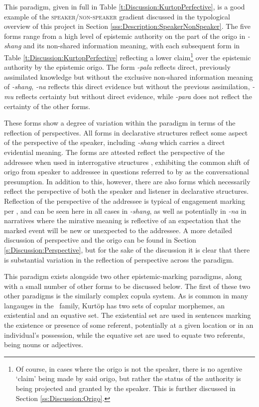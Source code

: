 This paradigm, given in full in Table \ref{t:Discussion:KurtopPerfective}, is a good example of the \textsc{speaker/non-speaker} gradient discussed in the typological overview of this project in Section \ref{sss:Description:SpeakerNonSpeaker}. The five forms range from a high level of epistemic authority on the part of the origo in \textit{-shang} and its non-shared information meaning, with each subsequent form in Table \ref{t:Discussion:KurtopPerfective} reflecting a lower claim\footnote{Of course, in cases where the origo is not the speaker, there is no agentive `claim' being made by said origo, but rather the status of the authority is being projected and granted by the speaker. This is further discussed in Section \ref{ss:Discussion:Origo}.} over the epistemic authority by the epistemic origo. The form \textit{-pala} reflects direct, previously assimilated knowledge but without the exclusive non-shared information meaning of \textit{-shang}, \textit{-na} reflects this direct evidence but without the previous assimilation, \textit{-mu} reflects certainty but without direct evidence, while \textit{-para} does not reflect the certainty of the other forms.

These forms show a degree of variation within the paradigm in terms of the reflection of perspectives. All forms in declarative structures reflect some aspect of the perspective of the speaker, including \textit{-shang} which carries a direct evidential meaning. The forms are attested reflect the perspective of the addressee when used in interrogative structures \cite{Hyslop2018}, exhibiting the common shift of origo from speaker to addressee in questions referred to by  as the conversational presumption. In addition to this, however, there are also forms which necessarily reflect the perspective of both the speaker and listener in declarative structures. Reflection of the perspective of the addressee is typical of engagement marking per , and can be seen here in all cases in \textit{-shang}, as well as potentially in \textit{-na} in narratives where the mirative meaning is reflective of an expectation that the marked event will be new or unexpected to the addressee. A more detailed discussion of perspective and the origo can be found in Section \ref{s:Discussion:Perspective}, but for the sake of the discussion it is clear that there is substantial variation in the reflection of perspective across the paradigm.

This paradigm exists alongside two other epistemic-marking paradigms, along with a small number of other forms to be discussed below. The first of these two other paradigms is the similarly complex copula system. As is common in many langauges in the \lfam\ family, Kurtöp has two sets of copular morphemes, an existential and an equative set. The existential set are used in sentences marking the existence or presence of some referent, potentially at a given location or in an individual's possession, while the equative set are used to equate two referents, being nouns or adjectives.

